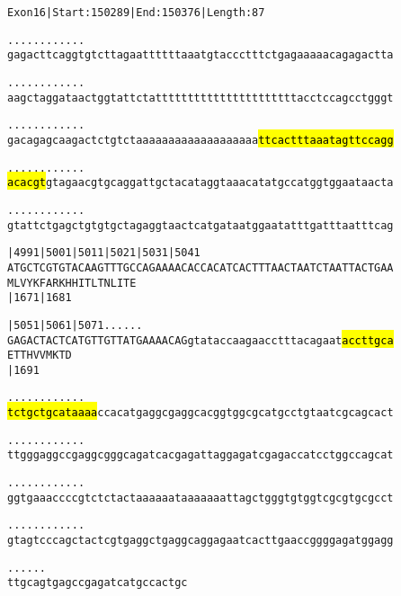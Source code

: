 \documentclass{article}
\begin{document}
\begin{alltt}
Exon 16 | Start: 150289 | End: 150376 | Length: 87

.    .    .    .    .    .    .    .    .    .    .    .    
gagacttcaggtgtcttagaattttttaaatgtaccctttctgagaaaaacagagactta

.    .    .    .    .    .    .    .    .    .    .    .    
aagctaggataactggtattctattttttttttttttttttttttacctccagcctgggt

.    .    .    .    .    .    .    .    .    .    .    .    
gacagagcaagactctgtctaaaaaaaaaaaaaaaaaaa\hl{ttcactttaaatagttccagg}

.    .    .    .    .    .    .    .    .    .    .    .    
\hl{acacgt}gtagaacgtgcaggattgctacataggtaaacatatgccatggtggaataacta

.    .    .    .    .    .    .    .    .    .    .    .    
gtattctgagctgtgtgctagaggtaactcatgataatggaatatttgatttaatttcag

    |4991     |5001     |5011     |5021     |5031     |5041 
ATGCTCGTGTACAAGTTTGCCAGAAAACACCACATCACTTTAACTAATCTAATTACTGAA
M  L  V  Y  K  F  A  R  K  H  H  I  T  L  T  N  L  I  T  E  
                        |1671                         |1681 

    |5051     |5061     |5071   .    .    .    .    .    .  
GAGACTACTCATGTTGTTATGAAAACAGgtataccaagaacctttacagaat\hl{accttgca}
E  T  T  H  V  V  M  K  T  D                                
                        |1691                               

  .    .    .    .    .    .    .    .    .    .    .    .  
\hl{tctgctgcataaaa}ccacatgaggcgaggcacggtggcgcatgcctgtaatcgcagcact

  .    .    .    .    .    .    .    .    .    .    .    .  
ttgggaggccgaggcgggcagatcacgagattaggagatcgagaccatcctggccagcat

  .    .    .    .    .    .    .    .    .    .    .    .  
ggtgaaaccccgtctctactaaaaaataaaaaaattagctgggtgtggtcgcgtgcgcct

  .    .    .    .    .    .    .    .    .    .    .    .  
gtagtcccagctactcgtgaggctgaggcaggagaatcacttgaaccggggagatggagg

  .    .    .    .    .    .
ttgcagtgagccgagatcatgccactgc
\end{alltt}
\newpage
\end{document}
